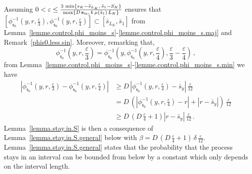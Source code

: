\documentclass[AHL,Unicode,longabstracts,published]{cedram}
\newcommand{\Sin}{{\mathbf s}_{\textrm{\tiny\rm in}}}
\newcommand{\SminK}{s_K}
\newcommand{\SmaxK}{S_K}
\newcommand{\barmu}{\mu(\bar s_1)}
\newcommand{\phis}{\phi_{\textsf{s}_0}^{-1}}
\newcommand{\lmax}{{L_K}}
\newcommand{\1}{\mathbf{1}}
\begin{document}
Assuming $0<\varepsilon\leq \frac{3\,\min\{\SminK-\bar s_{\lmax},\, \bar s_1-\SmaxK\}}{\max\{D\,\Sin,\, k\,\barmu\,\lmax\}}$ ensures that $[\phis(y,r,\frac{\varepsilon}{3}),\phis(y,r,\frac{\varepsilon}{4})]\subset [\bar s_{\lmax}, \bar s_1]$ from Lemma~\ref{lemme.control.phi_moins_s}-\ref{lemme.control.phi_moins_s.maj} and Remark~\ref{phis0.less.sin}. Moreover, remarking that,
\[
\phis\left(y,r, \frac{\varepsilon}{3}\right) = \phis\left(y,\phis\left(y,r, \frac{\varepsilon}{4}\right), \frac{\varepsilon}{3}-\frac{\varepsilon}{4}\right)\,,
\]
from Lemma~\ref{lemme.control.phi_moins_s}-\ref{lemme.control.phi_moins_s.min} we have
\begin{align*}
\left|\phis\left(y, r, \frac{\varepsilon}{3}\right) - \phis\left(y, r, \frac{\varepsilon}{4}\right)\right| & \geq D\,\left|\phis\left(y,r, \frac{\varepsilon}{4}\right) - \bar s_y\right|\,\frac{\varepsilon}{12}
\\
& = D\,\left(\left|\phis\left(y,r, \frac{\varepsilon}{4}\right) - r\right| + |r- \bar s_y|\right)\,\frac{\varepsilon}{12}
\\
& \geq D\,\left(D\,\frac{\varepsilon}{4}+1\right)|r- \bar s_y|\,\frac{\varepsilon}{12}\,.
\end{align*}
Lemma~\ref{lemma.stay.in.S} is then a consequence of Lemma~\ref{lemma.stay.in.S.general} below with $\beta= D\,(D\,\frac{\varepsilon}{4}+1)\,\delta\,\frac{\varepsilon}{12}$. Lemma~\ref{lemma.stay.in.S.general} states that the probability that the process stays in an interval can be bounded from below by a constant which only depends on the interval length.
\end{document}
